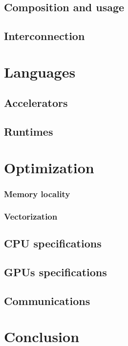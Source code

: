 \subsection{Composition and usage}

\subsection{Interconnection}

\section{Languages}

\subsection{Accelerators}

\subsection{Runtimes}

\section{Optimization}


\subsubsection{Memory locality}

\subsubsection{Vectorization}

\subsection{CPU specifications}

\subsection{GPUs specifications}

\subsection{Communications}

\section{Conclusion}
